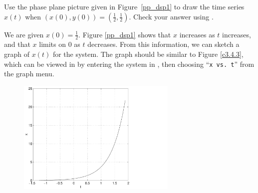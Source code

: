 \documentclass{ximera}
\begin{document}
\begin{exercise} \label{c3.4.3}
Use the phase plane picture given in Figure~\ref{pp_dsp1} to
draw the time series $x(t)$ when $(x(0),y(0)) =
\left(\frac{1}{2},\frac{1}{2}\right)$.  Check your answer using {\pplane}.

\begin{solution}

We are given $x(0) = \frac{1}{2}$.  Figure \ref{pp_dsp1}
shows that $x$ increases as $t$
increases, and that $x$ limits on $0$ as $t$ decreases.  From
this information, we can sketch a graph of $x(t)$ for the system.
The graph should be similar to Figure \ref{c3.4.3}, which can
be viewed in \Matlab by entering the system in {\pplane},
then choosing ``{\tt x vs.\ t}'' from the graph menu.

\begin{figure}[htb]
                       \centerline{%
                       \includegraphics[width=3.0in]{exfigure/3-4-3.pdf}}
\end{figure}

\end{solution}
\end{exercise}
\end{document}
